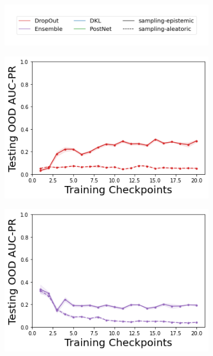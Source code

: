 \begin{figure}
    \centering
        \vspace{-3mm}
    \begin{subfigure}{.45\textwidth}
        \includegraphics[width=\textwidth]{sections/011_icml2022/resources/sampling-legend.png}
    \end{subfigure}
    \vspace{-3mm}
    
    \begin{subfigure}{.245\textwidth}
        \includegraphics[width=\textwidth]{sections/011_icml2022/resources/DropOut-CartPoleOOD-v0-AUC-PR-out-epistemic_-testing-strategy.png}
    \end{subfigure}
    \begin{subfigure}{.245\textwidth}
        \includegraphics[width=\textwidth]{sections/011_icml2022/resources/Ensemble-CartPoleOOD-v0-AUC-PR-out-epistemic_-testing-strategy.png}

\end{subfigure}
\end{figure}
